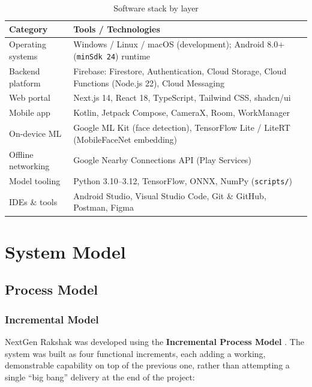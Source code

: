 \documentclass[12pt,a4paper,oneside]{report}
\newcommand{\code}[1]{\texttt{#1}}
\begin{document}
\begin{table}[H]
\centering
\caption{Software stack by layer}
\begin{tabular}{|p{3.3cm}|p{10.4cm}|}
\hline
\textbf{Category} & \textbf{Tools / Technologies} \\
\hline
Operating systems & Windows / Linux / macOS (development); Android 8.0+ (\code{minSdk 24}) runtime \\ \hline
Backend platform & Firebase: Firestore, Authentication, Cloud Storage, Cloud Functions (Node.js 22), Cloud Messaging \\ \hline
Web portal & Next.js 14, React 18, TypeScript, Tailwind CSS, shadcn/ui \\ \hline
Mobile app & Kotlin, Jetpack Compose, CameraX, Room, WorkManager \\ \hline
On-device ML & Google ML Kit (face detection), TensorFlow Lite / LiteRT (MobileFaceNet embedding) \\ \hline
Offline networking & Google Nearby Connections API (Play Services) \\ \hline
Model tooling & Python 3.10--3.12, TensorFlow, ONNX, NumPy (\code{scripts/}) \\ \hline
IDEs \& tools & Android Studio, Visual Studio Code, Git \& GitHub, Postman, Figma \\
\hline
\end{tabular}
\end{table}

\chapter{System Model}

\section{Process Model}

\subsection{Incremental Model}

NextGen Rakshak was developed using the \textbf{Incremental Process Model}
\cite{pressman}. The system was built as four functional increments, each adding a
working, demonstrable capability on top of the previous one, rather than
attempting a single ``big bang'' delivery at the end of the project:
\end{document}
